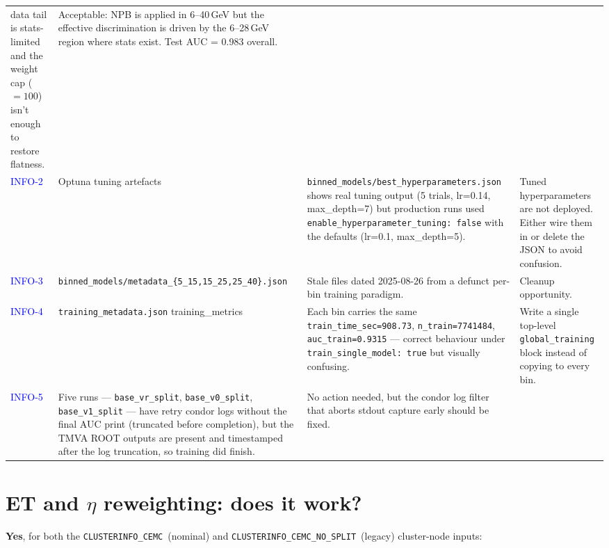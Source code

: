 \documentclass[11pt,a4paper]{article}
\newcommand{\splitnode}{\texttt{CLUSTERINFO\_CEMC}}
\newcommand{\nosplitnode}{\texttt{CLUSTERINFO\_CEMC\_NO\_SPLIT}}
\newcommand{\info}[1]{\textcolor{blue}{#1}}
\begin{document}
\begin{longtable}{@{}p{1.7cm}p{4.7cm}p{5.9cm}p{4.4cm}@{}}
 data tail is stats-limited and the weight cap ($=100$) isn't enough
 to restore flatness. &
 Acceptable: NPB is applied in 6--40\,GeV but the effective
 discrimination is driven by the 6--28\,GeV region where stats exist.
 Test AUC = 0.983 overall. \\
\addlinespace
\info{INFO-2} & Optuna tuning artefacts &
 \texttt{binned\_models/best\_hyperparameters.json} shows real tuning
 output (5 trials, lr=0.14, max\_depth=7) but production runs used
 \texttt{enable\_hyperparameter\_tuning: false} with the defaults
 (lr=0.1, max\_depth=5). &
 Tuned hyperparameters are not deployed. Either wire them in or
 delete the JSON to avoid confusion. \\
\addlinespace
\info{INFO-3} & \texttt{binned\_models/metadata\_\{5\_15,15\_25,25\_40\}.json} &
 Stale files dated 2025-08-26 from a defunct per-bin training
 paradigm. &
 Cleanup opportunity. \\
\addlinespace
\info{INFO-4} & \texttt{training\_metadata.json} training\_metrics &
 Each bin carries the same \texttt{train\_time\_sec=908.73},
 \texttt{n\_train=7741484}, \texttt{auc\_train=0.9315} --- correct
 behaviour under \texttt{train\_single\_model: true} but visually
 confusing. &
 Write a single top-level \texttt{global\_training} block instead of
 copying to every bin. \\
\addlinespace
\info{INFO-5} & Five runs --- \texttt{base\_vr\_split},
 \texttt{base\_v0\_split}, \texttt{base\_v1\_split} --- have retry
 condor logs without the final AUC print (truncated before completion),
 but the TMVA ROOT outputs are present and timestamped after the
 log truncation, so training did finish. &
 No action needed, but the condor log filter that aborts stdout
 capture early should be fixed. \\
\bottomrule
\end{longtable}

\section{ET and $\eta$ reweighting: does it work?}
\label{sec:reweighting}

\textbf{Yes}, for both the \splitnode\ (nominal) and \nosplitnode\ (legacy)
cluster-node inputs:
\end{document}
